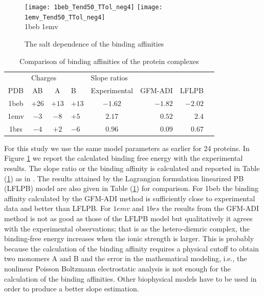 \begin{figure}[!t]
\begin{center}
\texttt{[image: 1beb\_Tend50\_TTol\_neg4]}
\texttt{[image: 1emv\_Tend50\_TTol\_neg4]}
\\
1beb \hskip 2.7in 1emv
\end{center}
\caption{The salt dependence of the binding affinities}
\label{fig_salt_effect}
\end{figure}

\begin{table}[!t]
\begin{center}
\begin{tabular}{ccclcrrr}
\hline
\multicolumn{1}{c}{}           & \multicolumn{3}{l}{Charges} & \multicolumn{3}{l}{Slope ratios} \\
 PDB  & AB    & A     & B      & Experimental & GFM-ADI & LFLPB   \\ \hline
 1beb & $+26$ & $+13$ & $+13$  & $-1.62$      & $-1.82$ & $-2.02$ \\ %
 1emv & $-3$  & $-8$  & $+5$   & $2.17$       & $0.52$  & $2.4$   \\
 1brs & $-4$  & $+2$  & $-6$   & $0.96$		  &	$0.09$ & $0.67$ 	  \\
	 \hline
\end{tabular}
\caption{Comparison of binding affinities of the protein complexes}
\label{tab_salt_effect}
\end{center}
\end{table}

 
For this study we use the same model parameters as earlier for 24 proteins. In Figure \ref{fig_salt_effect} we report the calculated binding free energy with the experimental results. The slope ratio or the binding affinity is calculated and reported in Table (\ref{tab_salt_effect}) as in \cite{Zhao2011}. The results attained by the Lagrangian formulation linearized PB (LFLPB) model \cite{Zhan2011} are also given in Table (\ref{tab_salt_effect}) for comparison. For 1beb the binding affinity calculated by the GFM-ADI method is sufficiently close to experimental data and better than LFLPB. For $1emv$ and $1brs$ the results from the GFM-ADI method is not as good as those of the LFLPB model but qualitatively it agrees with the experimental observations; that is as the hetero-diemric complex, the binding-free energy increases when the ionic strength is larger. This is probably because the calculation of the binding affinity requires a physical cutoff to obtain two monomers A and B and the error in the mathematical modeling, i.e., the nonlinear Poisson Boltzmann electrostatic analysis is not enough for the calculation of the binding affinities. Other biophysical models have to be used in order to produce a better slope estimation. 
   	



